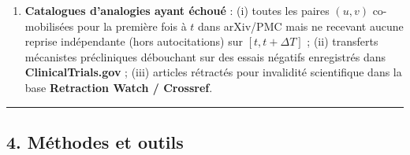 \documentclass[a4paper,11pt]{article}
\begin{document}
\begin{enumerate}
  \textbf{Catalogues de découvertes et de découvertes simultanées} :
  articles associés aux prix Nobel (Li, Yin, Fortunato, \& Wang, 2019, «
  A dataset of publication records for Nobel laureates »,
  \emph{Scientific Data}, 6, 33), paires but/mécanisme en ingénierie
  (Hope, Chan, Kittur, \& Shahaf, 2017, « Accelerating innovation
  through analogy mining », \emph{Proceedings of KDD}, 235--243), liste
  historique d'Ogburn \& Thomas (1922), et \emph{articles jumeaux}
  contemporains identifiés par co-citation symétrique et dates de
  soumission séparées par un court intervalle sans auteurs ni références
  croisés (méthode des \emph{paper twins} de Bikard, Murray, \& Gans,
  2015, « Exploring trade-offs in the organization of scientific work »,
  \emph{Management Science}, 61(7), 1473--1495).
\item
  \textbf{Catalogues d'analogies ayant échoué} : (i) toutes les paires
  \((u,v)\) co-mobilisées pour la première fois à \(t\) dans arXiv/PMC
  mais ne recevant aucune reprise indépendante (hors autocitations) sur
  \([t, t+\Delta T]\) ; (ii) transferts mécanistes précliniques
  débouchant sur des essais négatifs enregistrés dans
  \textbf{ClinicalTrials.gov} ; (iii) articles rétractés pour invalidité
  scientifique dans la base \textbf{Retraction Watch / Crossref}.
\end{enumerate}

\begin{center}\rule{0.5\linewidth}{0.5pt}\end{center}

\subsection*{4. Méthodes et outils}
\end{document}
